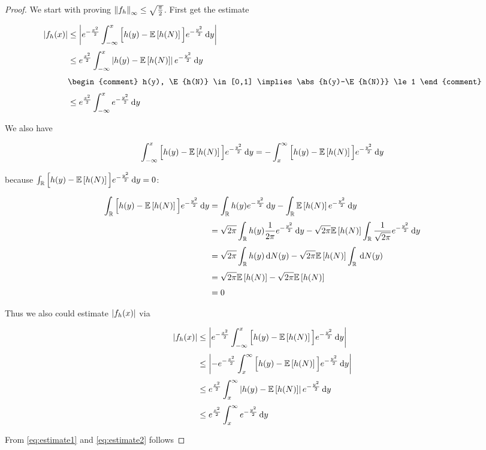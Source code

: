 \begin{proof}
  We start with proving $\left\|{f_h}\right\|_\infty\le \sqrt{\frac{\pi}{2}}$. First get the estimate

  \begin{align} \label{eq:estimate1}
    \abs{f_h(x)} & \le \abs{\e{-\frac{x^2}{2}} \int_{-\infty}^x \Big[ h(y) - \E{h(N)} \Big] \e{-\frac{y^2}{2}} \d{y} } \nl 
    &\le \e{\frac{x^2}{2}} \int_{-\infty}^x \abs{h(y)-\E{h(N)}} \e{-\frac{y^2}{2}}\d{y} \nl
    &
    \begin{comment}
      h(y), \E{h(N)} \in [0,1] \implies \abs{h(y)-\E{h(N)}} \le 1
    \end{comment} \nl
    & \le \e{\frac{x^2}{2}} \int_{-\infty}^x \e{-\frac{y^2}{2}} \d{y}
  \end{align}
  
  \noindent We also have

  \begin{align}
    \int_{-\infty}^x \Big[h(y)-\mathbb E\left[{h(N)}\right]\Big] e^{-\frac{y^2}{2}} \,\mathrm d{y} = -\int_{x}^\infty \Big[h(y)-\mathbb E\left[{h(N)}\right]\Big] e^{-\frac{y^2}{2}} \,\mathrm d{y}
  \end{align}

  \noindent because $\int_{\mathbb R} \Big[h(y)-\mathbb E\left[{h(N)}\right]\Big] e^{-\frac{y^2}{2}} \,\mathrm d{y}=0$:

  \begin{align} \label{eq:estimate2}
    \int_{\R} \Big[ h(y)-\E{h(N)} \Big] \e{-\frac{y^2}{2}} \d{y} & = \int_{\R} h(y) \e{-\frac{y^2}{2}} \d{y} - \int_{\R} \E{h(N)} \e{-\frac{y^2}2} \d{y} \nl
    &= \sqrt{2\pi} \int_{\R} h(y) \frac{1}{2\pi} \e{-\frac{y^2}{2}} \d{y} - \sqrt{2\pi} \E{h(N)} \int_{\R} \frac{1}{\sqrt{2\pi}} \e{-\frac{y^2}{2}} \d{y} \nl
    &= \sqrt{2\pi} \int_{\R} h(y) \d{N(y)} - \sqrt{2\pi} \E{h(N)} \int_{\R} \d{N(y)} \nl
    &= \sqrt{2\pi}\E{h(N)} - \sqrt{2\pi}\E{h(N)} \nl
    &= 0
  \end{align}

  \noindent Thus we also could estimate $\left|{f_h(x)}\right|$ via

  \begin{align}
    \abs{f_h(x)} & \le \abs{\e{-\frac{x^2}{2}} \int_{-\infty}^x \Big[ h(y) - \E{h(N)} \Big] \e{-\frac{y^2}{2}} \d{y} } \nl 
    & \le \abs{-\e{-\frac{x^2}{2}} \int_{x}^\infty \Big[ h(y) - \E{h(N)} \Big] \e{-\frac{y^2}{2}} \d{y} } \nl 
    &\le \e{\frac{x^2}{2}} \int_{x}^\infty \abs{h(y)-\E{h(N)}} \e{-\frac{y^2}{2}}\d{y} \nl
    &\le \e{\frac{x^2}{2}} \int_{x}^\infty \e{-\frac{y^2}{2}} \d{y}
  \end{align}
 
  \noindent From \eqref{eq:estimate1} and \eqref{eq:estimate2} follows


\end{proof}
